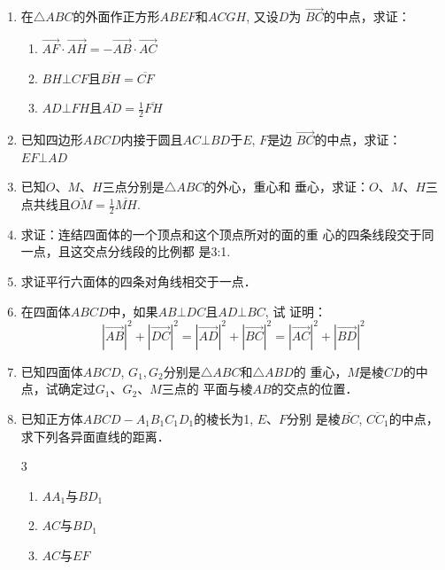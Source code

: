 \begin{enumerate}
\begin{figure}[htp]
    \caption*{第4题}
\end{figure}


\item 在$\triangle ABC$的外面作正方形$ABEF$和$ACGH$, 又设$D$为
$\Vec{BC}$的中点，求证：
\begin{enumerate}
    \item $\Vec{AF}\cdot \Vec{AH}=-\Vec{AB}\cdot \Vec{AC}$
    \item $BH\bot CF$且$\overline{BH}=\overline{CF}$
    \item $AD\bot FH$且$\overline{AD}=\frac{1}{2} \overline{FH}$
\end{enumerate}

\item 已知四边形$ABCD$内接于圆且$AC\bot BD$于$E$, $F$是边
$\Vec{BC}$的中点，求证：$EF\bot AD$
\item 已知$O$、$M$、$H$三点分别是$\triangle ABC$的外心，重心和
垂心，求证：$O$、$M$、$H$三点共线且$\overline{OM}=\frac{1}{2}\overline{MH}$.
\item 求证：连结四面体的一个顶点和这个顶点所对的面的重
心的四条线段交于同一点，且这交点分线段的比例都
是3:1.
\item 求证平行六面体的四条对角线相交于一点．
\item 在四面体$ABCD$中，如果$AB\bot DC$且$AD\bot BC$, 试
证明：
\[|\Vec{AB}|^2+|\Vec{DC}|^2=|\Vec{AD}|^2+|\Vec{BC}|^2=|\Vec{AC}|^2+|\Vec{BD}|^2\]
\item 已知四面体$ABCD$, $G_1,G_2$分别是$\triangle ABC$和$\triangle ABD$的
重心，$M$是棱$CD$的中点，试确定过$G_1$、$G_2$、$M$三点的
平面与棱$AB$的交点的位置．
\item 已知正方体$ABCD-A_1B_1C_1D_1$的棱长为1, $E$、$F$分别
是棱$\overline{BC}$, $\overline{CC_1}$的中点，求下列各异面直线的距离．
\begin{multicols}{3}
    \begin{enumerate}
        \item $AA_1$与$BD_1$
        \item $AC$与$BD_1$
        \item $AC$与$EF$
    \end{enumerate}
\end{multicols}
\end{enumerate}